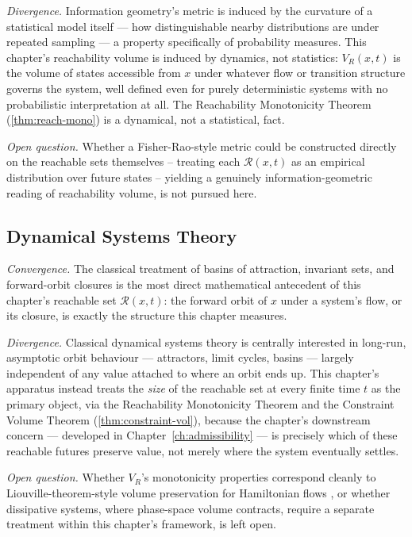 \documentclass[12pt,twoside,openright]{book}
\newcommand{\reach}{\mathcal{R}}
\begin{document}
\emph{Divergence.} Information geometry's metric is induced by
the curvature of a statistical model itself --- how
distinguishable nearby distributions are under repeated
sampling --- a property specifically of probability measures.
This chapter's reachability volume is induced by dynamics, not
statistics: $V_R(x,t)$ is the volume of states accessible from
$x$ under whatever flow or transition structure governs the
system, well defined even for purely deterministic systems with
no probabilistic interpretation at all. The Reachability
Monotonicity Theorem (\cref{thm:reach-mono}) is a dynamical, not
a statistical, fact.

\emph{Open question.} Whether a Fisher-Rao-style metric could be
constructed directly on the reachable sets themselves --
treating each $\reach(x,t)$ as an empirical distribution over
future states -- yielding a genuinely information-geometric
reading of reachability volume, is not pursued here.

\subsection*{Dynamical Systems Theory}

\emph{Convergence.} The classical treatment of basins of
attraction, invariant sets, and forward-orbit closures
\parencite{strogatz2015,smale1967} is the most direct
mathematical antecedent of this chapter's reachable set
$\reach(x,t)$: the forward orbit of $x$ under a system's flow,
or its closure, is exactly the structure this chapter measures.

\emph{Divergence.} Classical dynamical systems theory is
centrally interested in long-run, asymptotic orbit behaviour ---
attractors, limit cycles, basins --- largely independent of any
value attached to where an orbit ends up. This chapter's
apparatus instead treats the \emph{size} of the reachable set
at every finite time $t$ as the primary object, via the
Reachability Monotonicity Theorem and the Constraint Volume
Theorem (\cref{thm:constraint-vol}), because the chapter's
downstream concern --- developed in Chapter~\ref{ch:admissibility}
--- is precisely which of these reachable futures preserve
value, not merely where the system eventually settles.

\emph{Open question.} Whether $V_R$'s monotonicity properties
correspond cleanly to Liouville-theorem-style volume
preservation for Hamiltonian flows \parencite{arnold1989}, or
whether dissipative systems, where phase-space volume
contracts, require a separate treatment within this chapter's
framework, is left open.
\end{document}
